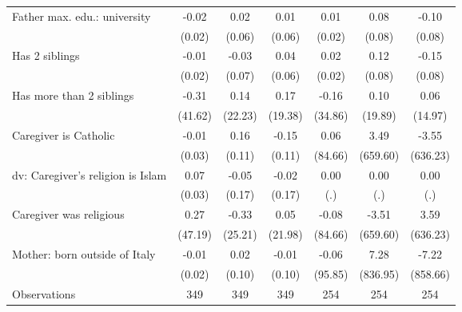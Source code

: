 {\begin{tabular}{l*{6}{c}}
\addlinespace
Father max. edu.: university&       -0.02         &        0.02         &        0.01         &        0.01         &        0.08         &       -0.10         \\
                    &      (0.02)         &      (0.06)         &      (0.06)         &      (0.02)         &      (0.08)         &      (0.08)         \\
\addlinespace
Has 2 siblings      &       -0.01         &       -0.03         &        0.04         &        0.02         &        0.12         &       -0.15         \\
                    &      (0.02)         &      (0.07)         &      (0.06)         &      (0.02)         &      (0.08)         &      (0.08)         \\
\addlinespace
Has more than 2 siblings&       -0.31         &        0.14         &        0.17         &       -0.16         &        0.10         &        0.06         \\
                    &     (41.62)         &     (22.23)         &     (19.38)         &     (34.86)         &     (19.89)         &     (14.97)         \\
\addlinespace
Caregiver is Catholic&       -0.01         &        0.16         &       -0.15         &        0.06         &        3.49         &       -3.55         \\
                    &      (0.03)         &      (0.11)         &      (0.11)         &     (84.66)         &    (659.60)         &    (636.23)         \\
\addlinespace
dv: Caregiver's religion is Islam&        0.07\sym{**} &       -0.05         &       -0.02         &        0.00         &        0.00         &        0.00         \\
                    &      (0.03)         &      (0.17)         &      (0.17)         &         (.)         &         (.)         &         (.)         \\
\addlinespace
Caregiver was religious&        0.27         &       -0.33         &        0.05         &       -0.08         &       -3.51         &        3.59         \\
                    &     (47.19)         &     (25.21)         &     (21.98)         &     (84.66)         &    (659.60)         &    (636.23)         \\
\addlinespace
Mother: born outside of Italy&       -0.01         &        0.02         &       -0.01         &       -0.06         &        7.28         &       -7.22         \\
                    &      (0.02)         &      (0.10)         &      (0.10)         &     (95.85)         &    (836.95)         &    (858.66)         \\
\midrule
Observations        &         349         &         349         &         349         &         254         &         254         &         254         \\
\bottomrule
\end{tabular}
}
